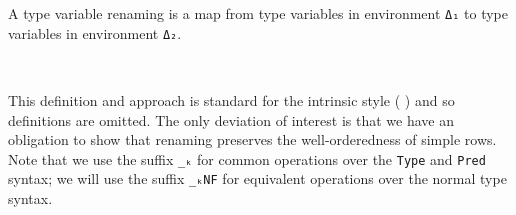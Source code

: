 \documentclass[authoryear, acmsmall, screen, review, nonacm]{acmart} %
\begin{document}
A type variable renaming is a map from type variables in environment \verb!Δ₁! to type variables in environment \verb!Δ₂!. 
\begin{code}%
\>[0]\AgdaSpace{}%
\AgdaSymbol{:}\AgdaSpace{}%
\AgdaSpace{}%
\AgdaSpace{}%
\AgdaSpace{}%
\AgdaSpace{}%
\<%
\\
\>[0]\AgdaSpace{}%
\AgdaSpace{}%
\AgdaSpace{}%
\AgdaSymbol{=}\AgdaSpace{}%
\AgdaSpace{}%
\AgdaSymbol{\{}\AgdaSymbol{\}}\AgdaSpace{}%
\AgdaSpace{}%
\AgdaSpace{}%
\AgdaSpace{}%
\AgdaSpace{}%
\AgdaSpace{}%
\AgdaSpace{}%
\AgdaSpace{}%
\<%
\end{code}

\Ni This definition and approach is standard for the intrinsic style (\cf{} \citet{plfa22, ChapmanKNW19}) and so definitions are omitted. The only deviation of interest is that we have an obligation to show that renaming preserves the well-orderedness of simple rows. Note that we use the suffix \verb!_ₖ! for common operations over the \verb!Type! and \verb!Pred! syntax; we will use the suffix \verb!_ₖNF! for equivalent operations over the normal type syntax.
\end{document}
